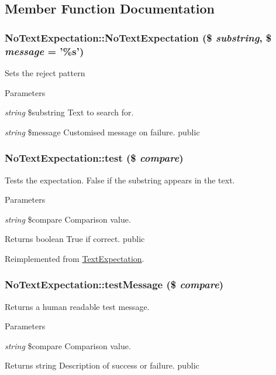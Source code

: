\subsection{Member Function Documentation}
\hypertarget{class_no_text_expectation_a5fa890c550df5e3ecf2e17719fac8412}{
\subsubsection[{NoTextExpectation}]{\setlength{\rightskip}{0pt plus 5cm}NoTextExpectation::NoTextExpectation (\$ {\em substring}, \/  \$ {\em message} = {\ttfamily '\%s'})}}
\label{class_no_text_expectation_a5fa890c550df5e3ecf2e17719fac8412}
Sets the reject pattern 
\begin{DoxyParams}{Parameters}
\item[{\em string}]\$substring Text to search for. \item[{\em string}]\$message Customised message on failure.  public \end{DoxyParams}
\hypertarget{class_no_text_expectation_aea5e85eb1d03d5f48cb463f09d756a9e}{
\subsubsection[{test}]{\setlength{\rightskip}{0pt plus 5cm}NoTextExpectation::test (\$ {\em compare})}}
\label{class_no_text_expectation_aea5e85eb1d03d5f48cb463f09d756a9e}
Tests the expectation. False if the substring appears in the text. 
\begin{DoxyParams}{Parameters}
\item[{\em string}]\$compare Comparison value. \end{DoxyParams}
\begin{DoxyReturn}{Returns}
boolean True if correct.  public 
\end{DoxyReturn}


Reimplemented from \hyperlink{class_text_expectation_a352a2a95ccf1c29c886b7608338d3c20}{TextExpectation}.\hypertarget{class_no_text_expectation_ab233e35e0f5912da893c34c8eda835fc}{
\subsubsection[{testMessage}]{\setlength{\rightskip}{0pt plus 5cm}NoTextExpectation::testMessage (\$ {\em compare})}}
\label{class_no_text_expectation_ab233e35e0f5912da893c34c8eda835fc}
Returns a human readable test message. 
\begin{DoxyParams}{Parameters}
\item[{\em string}]\$compare Comparison value. \end{DoxyParams}
\begin{DoxyReturn}{Returns}
string Description of success or failure.  public 
\end{DoxyReturn}



